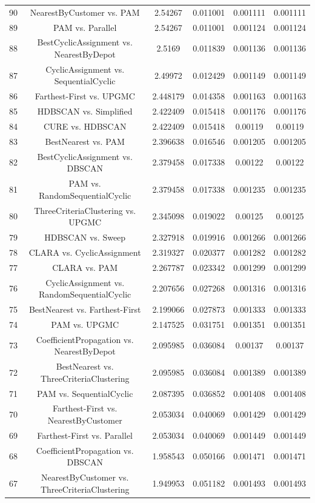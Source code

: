 \documentclass[a4paper,10pt]{article}
\begin{document}
\begin{landscape}
\begin{table}[!htp]
\begin{tabular}{cccccc}
90&NearestByCustomer vs. PAM&2.54267&0.011001&0.001111&0.001111\\
89&PAM vs. Parallel&2.54267&0.011001&0.001124&0.001124\\
88&BestCyclicAssignment vs. NearestByDepot&2.5169&0.011839&0.001136&0.001136\\
87&CyclicAssignment vs. SequentialCyclic&2.49972&0.012429&0.001149&0.001149\\
86&Farthest-First vs. UPGMC&2.448179&0.014358&0.001163&0.001163\\
85&HDBSCAN vs. Simplified&2.422409&0.015418&0.001176&0.001176\\
84&CURE vs. HDBSCAN&2.422409&0.015418&0.00119&0.00119\\
83&BestNearest vs. PAM&2.396638&0.016546&0.001205&0.001205\\
82&BestCyclicAssignment vs. DBSCAN&2.379458&0.017338&0.00122&0.00122\\
81&PAM vs. RandomSequentialCyclic&2.379458&0.017338&0.001235&0.001235\\
80&ThreeCriteriaClustering vs. UPGMC&2.345098&0.019022&0.00125&0.00125\\
79&HDBSCAN vs. Sweep&2.327918&0.019916&0.001266&0.001266\\
78&CLARA vs. CyclicAssignment&2.319327&0.020377&0.001282&0.001282\\
77&CLARA vs. PAM&2.267787&0.023342&0.001299&0.001299\\
76&CyclicAssignment vs. RandomSequentialCyclic&2.207656&0.027268&0.001316&0.001316\\
75&BestNearest vs. Farthest-First&2.199066&0.027873&0.001333&0.001333\\
74&PAM vs. UPGMC&2.147525&0.031751&0.001351&0.001351\\
73&CoefficientPropagation vs. NearestByDepot&2.095985&0.036084&0.00137&0.00137\\
72&BestNearest vs. ThreeCriteriaClustering&2.095985&0.036084&0.001389&0.001389\\
71&PAM vs. SequentialCyclic&2.087395&0.036852&0.001408&0.001408\\
70&Farthest-First vs. NearestByCustomer&2.053034&0.040069&0.001429&0.001429\\
69&Farthest-First vs. Parallel&2.053034&0.040069&0.001449&0.001449\\
68&CoefficientPropagation vs. DBSCAN&1.958543&0.050166&0.001471&0.001471\\
67&NearestByCustomer vs. ThreeCriteriaClustering&1.949953&0.051182&0.001493&0.001493\\

\end{tabular}
\end{table}
\end{landscape}
\end{document}
